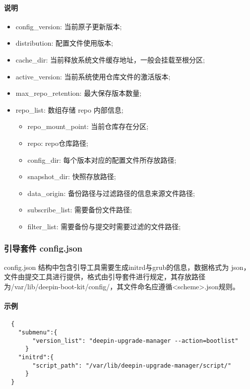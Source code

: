 \documentclass{utart}
\begin{document}
\paragraph{说明}
\begin{itemize}[leftmargin=4em]
  \item config\_version: 当前原子更新版本;
  \item distribution: 配置文件使用版本;
  \item cache\_dir: 当前释放系统文件缓存地址，一般会挂载至根分区;
  \item active\_version: 当前系统使用仓库文件的激活版本;
  \item max\_repo\_retention: 最大保存版本数量;
  \item repo\_list: 数组存储 repo 内部信息;
    \begin{itemize}[leftmargin=4em]
    \item repo\_mount\_point: 当前仓库存在分区;
    \item repo: repo仓库路径;
    \item config\_dir: 每个版本对应的配置文件所存放路径;
    \item snapshot\_dir: 快照存放路径;
    \item data\_origin: 备份路径与过滤路径的信息来源文件路径;
    \item subscribe\_list: 需要备份文件路径;
    \item filter\_list: 需要备份与提交时需要过滤的文件路径;
    \end{itemize}
\end{itemize}

\subsubsection{引导套件 config.json}
config.json 结构中包含引导工具需要生成initrd与grub的信息，数据格式为 json，文件由提交工具进行提供，格式由引导套件进行规定，其存放路径为/var/lib/deepin-boot-kit/config/，其文件命名应遵循<scheme>.json规则。

\paragraph{示例}
\begin{lstlisting}
  {
    "submenu":{
        "version_list": "deepin-upgrade-manager --action=bootlist"
      }
    "initrd":{
        "script_path": "/var/lib/deepin-upgrade-manager/script/"
      }
  }
\end{lstlisting}
\end{document}
